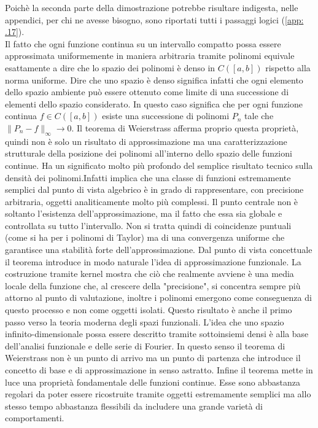 \documentclass[a4paper,12pt]{report}
\begin{document}
Poichè la seconda parte della dimostrazione potrebbe risultare indigesta, nelle appendici, per chi ne avesse bisogno, sono riportati tutti i passaggi logici (\ref{app: .17}).
\\Il fatto che ogni funzione continua su un intervallo compatto possa essere approssimata uniformemente in maniera arbitraria tramite polinomi equivale esattamente a dire che lo spazio dei polinomi è denso in $C([a,b])$ rispetto alla norma uniforme. Dire che uno spazio è denso significa infatti che ogni elemento dello spazio ambiente può essere ottenuto come limite di una successione di elementi dello spazio considerato. In questo caso significa che per ogni funzione continua $f\in C([a,b])$ esiste una successione di polinomi $P_n$ tale che $\|P_n-f\|_\infty\to 0$. Il teorema di Weierstrass afferma proprio questa proprietà, quindi non è solo un risultato di approssimazione ma una caratterizzazione strutturale della posizione dei polinomi all’interno dello spazio delle funzioni continue. Ha un significato molto più profondo del semplice risultato tecnico sulla densità dei polinomi.Infatti implica che una classe di funzioni estremamente semplici dal punto di vista algebrico è in grado di rappresentare, con precisione arbitraria, oggetti analiticamente molto più complessi. Il punto centrale non è soltanto l’esistenza dell’approssimazione, ma il fatto che essa sia globale e controllata su tutto l’intervallo. Non si tratta quindi di coincidenze puntuali (come si ha per i polinomi di Taylor) ma di una convergenza uniforme che garantisce una stabilità forte dell’approssimazione. Dal punto di vista concettuale il teorema introduce in modo naturale l’idea di approssimazione funzionale. La costruzione tramite kernel mostra che ciò che realmente avviene è una media locale della funzione che, al crescere della "precisione", si concentra sempre più attorno al punto di valutazione, inoltre i polinomi emergono come conseguenza di questo processo e non come oggetti isolati. Questo risultato è anche il primo passo verso la teoria moderna degli spazi funzionali. L’idea che uno spazio infinito-dimensionale possa essere descritto tramite sottoinsiemi densi è alla base dell’analisi funzionale e delle serie di Fourier. In questo senso il teorema di Weierstrass non è un punto di arrivo ma un punto di partenza che introduce il concetto di base e di approssimazione in senso astratto. Infine il teorema mette in luce una proprietà fondamentale delle funzioni continue. Esse sono abbastanza regolari da poter essere ricostruite tramite oggetti estremamente semplici ma allo stesso tempo abbastanza flessibili da includere una grande varietà di comportamenti. 
\end{document}
